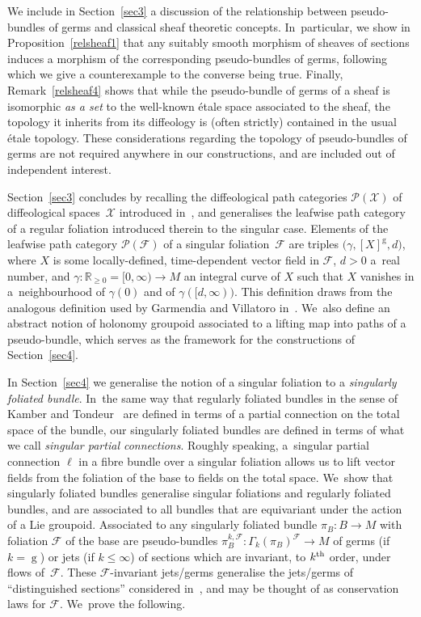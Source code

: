 \documentclass[pdftex]{sigma}
\numberwithin{equation}{section}
\def\g{\operatorname{g}}
\def\FF{{\mathcal{F}}}
\def\PP{{\mathcal{P}}}
\def\XX{{\mathcal{X}}}
\def\RB{{\mathbb{R}}}
\begin{document}
We include in Section~\ref{sec3} a discussion of the relationship between pseudo-bundles of germs and classical sheaf theoretic concepts. In~particular, we show in Proposition~\ref{relsheaf1} that any sui\-t\-ably smooth morphism of sheaves of sections induces a morphism of the corresponding pseudo-bundles of germs, following which we give a counterexample to the converse being true. Finally, Remark~\ref{relsheaf4} shows that while the pseudo-bundle of germs of a sheaf is isomorphic \textit{as a set} to the well-known \'{e}tale space associated to the sheaf, the topology it inherits from its diffeology is (often strictly) contained in the usual \'{e}tale topology. These considerations regarding the topology of pseudo-bundles of germs are not required anywhere in our constructions, and are included out of independent interest.

Section~\ref{sec3} concludes by recalling the diffeological path categories $\PP(\XX)$ of diffeological spa\-ces~$\XX$ introduced in~\cite{mac3}, and generalises the leafwise path category of a regular foliation introduced therein to the singular case. Elements of the leafwise path category $\PP(\FF)$ of a singular foliation~$\FF$ are triples $\big(\gamma,[X]^{\g},d\big)$, where $X$ is some locally-defined, time-dependent vector field in $\FF$, $d>0$ a~real number, and $\gamma\colon \RB_{\geq0} = [0,\infty)\rightarrow M$ an integral curve of $X$ such that $X$ vanishes in a~neigh\-bour\-hood of $\gamma(0)$ and of $\gamma([d,\infty))$. This definition draws from the analogous definition used by Garmendia and Villatoro in~\cite{VilGar1}. We~also define an abstract notion of holonomy groupoid associated to a lifting map into paths of a pseudo-bundle, which serves as the framework for the constructions of Section~\ref{sec4}.

In Section~\ref{sec4} we generalise the notion of a singular foliation to a \textit{singularly foliated bundle}. In~the same way that regularly foliated bundles in the sense of Kamber and Tondeur~\cite{folbund} are defined in terms of a partial connection on the total space of the bundle, our singularly foliated bundles are defined in terms of what we call \textit{singular partial connections}. Roughly speaking, a~singular partial connection $\ell$ in a fibre bundle over a singular foliation allows us to lift vector fields from the foliation of the base to fields on the total space. We~show that singularly foliated bundles generalise singular foliations and regularly foliated bundles, and are associated to all bundles that are equivariant under the action of a Lie groupoid. Associated to any singularly foliated bundle $\pi_{B}\colon B\rightarrow M$ with foliation $\FF$ of the base are pseudo-bundles $\pi_{B}^{k,\FF}\colon \Gamma_{k}(\pi_{B})^{\FF}\rightarrow M$ of germs (if~$k=\g$) or jets (if $k\leq\infty$) of sections which are invariant, to $k^{\rm th}$ order, under flows of~$\FF$. These $\FF$-invariant jets/germs generalise the jets/germs of ``distinguished sections'' considered in~\cite{mac3}, and may be thought of as conservation laws for $\FF$. We~prove the following.
\end{document}
